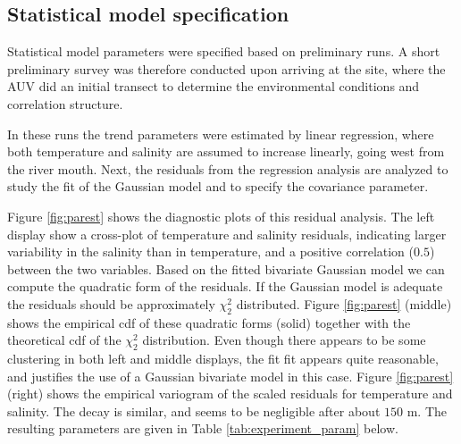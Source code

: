 \documentclass[aoas]{imsart}
\begin{document}
\subsection{Statistical model specification}

Statistical model parameters were specified based on preliminary runs. A short preliminary survey was therefore conducted upon arriving at the site, where the AUV did an initial transect to determine the environmental conditions and correlation structure.  

In these runs the trend parameters were estimated by linear regression, where both temperature and salinity are assumed to increase linearly, going west from the river mouth. Next, the residuals from the regression analysis are analyzed to study the fit of the Gaussian model and to specify the covariance parameter. 

Figure \ref{fig:parest} shows the diagnostic plots of this residual analysis. The left display show a cross-plot of temperature and salinity residuals, indicating larger variability in the salinity than in temperature, and a positive correlation ($0.5$) between the two variables. Based on the fitted bivariate Gaussian model we can compute the quadratic form of the residuals. If the Gaussian model is adequate the residuals should be approximately $\chi^2_2$ distributed. Figure \ref{fig:parest} (middle) shows the empirical cdf of these quadratic forms (solid) together with the theoretical cdf of the $\chi^2_2$ distribution. Even though there appears to be some clustering in both left and middle displays, the fit fit appears quite reasonable, and justifies the use of a Gaussian bivariate model in this case. Figure \ref{fig:parest} (right) shows the empirical variogram of the scaled residuals for temperature and salinity. The decay is similar, and seems to be negligible after about $150$ m. The resulting parameters are given in Table \ref{tab:experiment_param} below.


\end{document}
